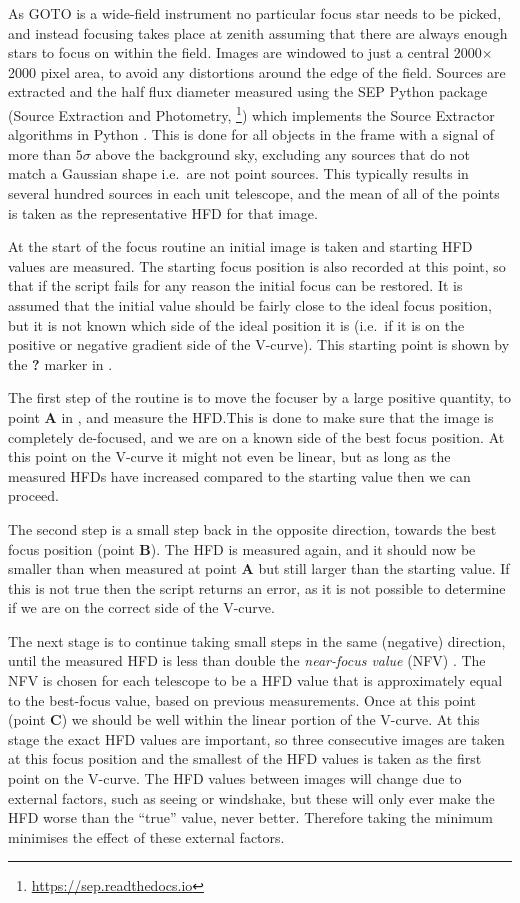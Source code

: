 \begin{colsection}
As GOTO is a wide-field instrument no particular focus star needs to be picked, and instead focusing takes place at zenith assuming that there are always enough stars to focus on within the field. Images are windowed to just a central 2000$\times$2000 pixel area, to avoid any distortions around the edge of the field. Sources are extracted and the half flux diameter measured using the SEP Python package (Source Extraction and Photometry, \footnote{\url{https://sep.readthedocs.io}}) which implements the Source Extractor algorithms in Python \citep{SE}. This is done for all objects in the frame with a signal of more than $5\sigma$ above the background sky, excluding any sources that do not match a Gaussian shape i.e.\ are not point sources. This typically results in several hundred sources in each unit telescope, and the mean of all of the points is taken as the representative HFD for that image.

At the start of the focus routine an initial image is taken and starting HFD values are measured. The starting focus position is also recorded at this point, so that if the script fails for any reason the initial focus can be restored. It is assumed that the initial value should be fairly close to the ideal focus position, but it is not known which side of the ideal position it is (i.e.\ if it is on the positive or negative gradient side of the V-curve). This starting point is shown by the \textbf{?} marker in .

The first step of the routine is to move the focuser by a large positive quantity, to point \textbf{A} in , and measure the HFD.\@ This is done to make sure that the image is completely de-focused, and we are on a known side of the best focus position. At this point on the V-curve it might not even be linear, but as long as the measured HFDs have increased compared to the starting value then we can proceed.

The second step is a small step back in the opposite direction, towards the best focus position (point \textbf{B}). The HFD is measured again, and it should now be smaller than when measured at point \textbf{A} but still larger than the starting value. If this is not true then the script returns an error, as it is not possible to determine if we are on the correct side of the V-curve.

The next stage is to continue taking small steps in the same (negative) direction, until the measured HFD is less than double the \emph{near-focus value} (NFV) . The NFV is chosen for each telescope to be a HFD value that is approximately equal to the best-focus value, based on previous measurements. Once at this point (point \textbf{C}) we should be well within the linear portion of the V-curve. At this stage the exact HFD values are important, so three consecutive images are taken at this focus position and the smallest of the HFD values is taken as the first point on the V-curve. The HFD values between images will change due to external factors, such as seeing or windshake, but these will only ever make the HFD worse than the ``true'' value, never better. Therefore taking the minimum minimises the effect of these external factors.


\end{colsection}
